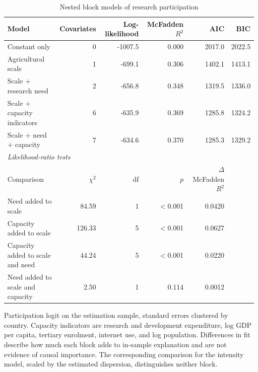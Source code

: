 \begin{table}[!t]
\centering
\footnotesize
\caption{Nested block models of research participation}
\label{tab:blocks}
\begin{tabular*}{\textwidth}{@{\extracolsep\fill}l r r r r r@{}}
\toprule
Model & Covariates & Log-likelihood & McFadden $R^2$ & AIC & BIC \\
\midrule
Constant only & 0 & -1007.5 & 0.000 & 2017.0 & 2022.5 \\
Agricultural scale & 1 & -699.1 & 0.306 & 1402.1 & 1413.1 \\
Scale $+$ research need & 2 & -656.8 & 0.348 & 1319.5 & 1336.0 \\
Scale $+$ capacity indicators & 6 & -635.9 & 0.369 & 1285.8 & 1324.2 \\
Scale $+$ need $+$ capacity & 7 & -634.6 & 0.370 & 1285.3 & 1329.2 \\
\midrule
\multicolumn{6}{l}{\textit{Likelihood-ratio tests}} \\
Comparison & $\chi^2$ & df & $p$ & $\Delta$ McFadden $R^2$ & \\
Need added to scale & 84.59 & 1 & $<$0.001 & 0.0420 & \\
Capacity added to scale & 126.33 & 5 & $<$0.001 & 0.0627 & \\
Capacity added to scale and need & 44.24 & 5 & $<$0.001 & 0.0220 & \\
Need added to scale and capacity & 2.50 & 1 & 0.114 & 0.0012 & \\
\bottomrule
\end{tabular*}
\begin{tablenotes}
\item[] Participation logit on the estimation sample, standard errors clustered by country. Capacity indicators are research and development expenditure, log GDP per capita, tertiary enrolment, internet use, and log population. Differences in fit describe how much each block adds to in-sample explanation and are not evidence of causal importance. The corresponding comparison for the intensity model, scaled by the estimated dispersion, distinguishes neither block.
\end{tablenotes}
\end{table}
